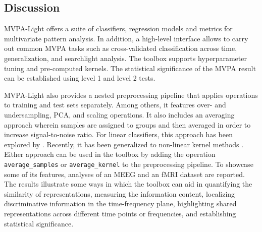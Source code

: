 \documentclass[utf8]{frontiersSCNS} %
\newcommand{\ttt}[1]{\texttt{#1}}
\begin{document}
\subsection{Discussion}

MVPA-Light offers a suite of classifiers, regression models and metrics for multivariate pattern analysis. In addition, a high-level interface allows to carry out common MVPA tasks such as cross-validated classification across time,  generalization, and searchlight analysis. The toolbox supports hyperparameter tuning and pre-computed kernels. The statistical significance of the MVPA result can be established using level 1 and level 2 tests.

MVPA-Light also provides a nested preprocessing pipeline that applies operations to training and test sets separately. Among others, it features over- and undersampling, PCA, and scaling operations. It also includes an averaging approach wherein samples are assigned to groups and then averaged in order to increase signal-to-noise ratio. For linear classifiers, this approach has been explored by \citep{Cichy2015,Cichy2017MultivariateSpace}. Recently, it has been generalized to non-linear kernel methods \citep{Treder2018}. Either approach can be used in the toolbox by adding the operation \ttt{average\_samples} or \ttt{average\_kernel} to the preprocessing pipeline. 
To showcase some of its features, analyses of an MEEG \citep{Wakeman2015ADataset} and an fMRI \citep{Haxby2001} dataset are reported. The results illustrate some ways in which the toolbox can aid in quantifying the similarity of representations, measuring the information content, localizing discriminative information in the time-frequency plane, highlighting shared representations across different time points or frequencies, and establishing statistical significance.
\end{document}
